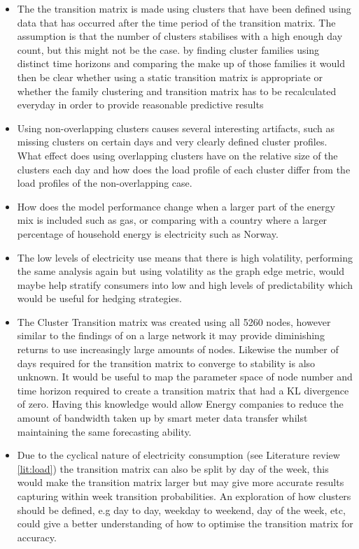 \begin{itemize}
    \item The the transition matrix is made using clusters that have been defined using data that has occurred after the time period of the transition matrix. The assumption is that the number of clusters stabilises with a high enough day count, but this might not be the case. by finding cluster families using distinct time horizons and comparing the make up of those families it would then be clear whether using a static transition matrix is appropriate or whether the family clustering and transition matrix has to be recalculated everyday in order to provide reasonable predictive results
    
    \item Using non-overlapping clusters causes several interesting artifacts, such as missing clusters on certain days and very clearly defined cluster profiles. What effect does using overlapping clusters have on the relative size of the clusters each day and how does the load profile of each cluster differ from the load profiles of the non-overlapping case.
    
    \item How does the model performance change when a larger part of the energy mix is included such as gas, or comparing with a country where a larger percentage of household energy is electricity such as Norway.

    \item The low levels of electricity use means that there is high volatility, performing the same analysis again but using volatility as the graph edge metric, would maybe help stratify consumers into low and high levels of predictability which would be useful for hedging strategies.
    
    \item The Cluster Transition matrix was created using all 5260 nodes, however similar to the findings of \cite{kavousian2013} on a large network it may provide diminishing returns to use increasingly large amounts of nodes. Likewise the number of days required for the transition matrix to converge to stability is also unknown. It would be useful to map the parameter space of node number and time horizon required to create a transition matrix that had a KL divergence of zero. Having this knowledge would allow Energy companies to reduce the amount of bandwidth taken up by smart meter data transfer whilst maintaining the same forecasting ability.
    
    \item Due to the cyclical nature of electricity consumption (see Literature review \ref{lit:load}) the transition matrix can also be split by day of the week, this would make the transition matrix larger but may give more accurate results capturing within week transition probabilities. An exploration of how clusters should be defined, e.g day to day, weekday to weekend, day of the week, etc, could give a better understanding of how to optimise the transition matrix for accuracy.
\end{itemize}